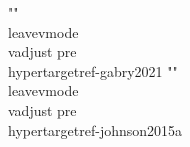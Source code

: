 {{{{{{{{{{{{{{{{{{{{{{{{{{{{""\\leavevmode\\vadjust pre{\\hypertarget{ref-gabry2021}{}}%
""\\leavevmode\\vadjust pre{\\hypertarget{ref-johnson2015a}{}}%
}}}}}}}}}}}}}}}}}}}}}}}}}}}}
